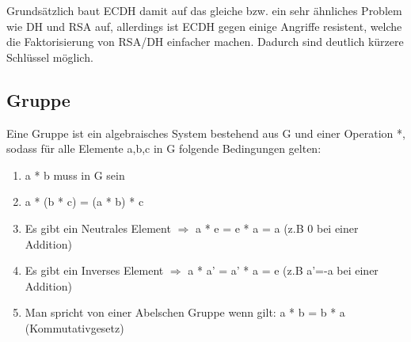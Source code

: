 Grundsätzlich baut ECDH damit auf das gleiche bzw. ein sehr ähnliches Problem wie DH und RSA auf, allerdings ist ECDH gegen einige Angriffe resistent, welche die Faktorisierung von RSA/DH einfacher machen. Dadurch sind deutlich kürzere Schlüssel möglich.

\subsection{Gruppe}\label{sec:gruppe}
Eine Gruppe ist ein algebraisches System bestehend aus G und einer Operation *, sodass für alle Elemente a,b,c in G folgende Bedingungen gelten:
\begin{enumerate}
	\item a * b muss in G sein
	\item a * (b * c) = (a * b) * c
	\item Es gibt ein Neutrales Element $\Rightarrow$ a * e = e * a = a (z.B 0 bei einer Addition)
	\item Es gibt ein Inverses Element $\Rightarrow$ a * a' = a' * a = e (z.B a'=-a bei einer Addition)
	\item Man spricht von einer Abelschen Gruppe wenn gilt: a * b = b * a (Kommutativgesetz)
\end{enumerate}

